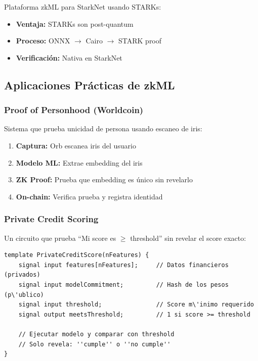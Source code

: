 \documentclass[11pt,a4paper,twoside]{book}
\begin{document}
\begin{definition}
Plataforma zkML para StarkNet usando STARKs:
\begin{itemize}
    \item \textbf{Ventaja:} STARKs son post-quantum
    \item \textbf{Proceso:} ONNX $\to$ Cairo $\to$ STARK proof
    \item \textbf{Verificaci\'on:} Nativa en StarkNet
\end{itemize}
\end{definition}

\subsection{Aplicaciones Pr\'acticas de zkML}

\subsubsection{Proof of Personhood (Worldcoin)}

\begin{definition}
Sistema que prueba unicidad de persona usando escaneo de iris:
\begin{enumerate}
    \item \textbf{Captura:} Orb escanea iris del usuario
    \item \textbf{Modelo ML:} Extrae embedding del iris
    \item \textbf{ZK Proof:} Prueba que embedding es \'unico sin revelarlo
    \item \textbf{On-chain:} Verifica prueba y registra identidad
\end{enumerate}
\end{definition}

\subsubsection{Private Credit Scoring}

\begin{example}
Un circuito que prueba ``Mi score es $\geq$ threshold'' sin revelar el score exacto:
\begin{verbatim}
template PrivateCreditScore(nFeatures) {
    signal input features[nFeatures];     // Datos financieros (privados)
    signal input modelCommitment;         // Hash de los pesos (p\'ublico)
    signal input threshold;               // Score m\'inimo requerido
    signal output meetsThreshold;         // 1 si score >= threshold
    
    // Ejecutar modelo y comparar con threshold
    // Solo revela: ''cumple'' o ''no cumple''
}
\end{verbatim}
\end{example}
\end{document}

